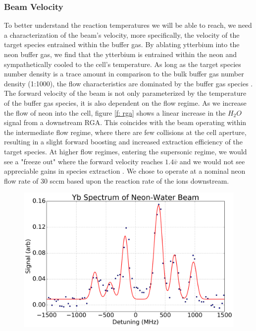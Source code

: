 \documentclass[a4paper]{article}
\begin{document}
\subsubsection{Beam Velocity}

To better understand the reaction temperatures we will be able to reach, we need a characterization of the beam's velocity, more specifically, the velocity of the target species entrained within the buffer gas. By ablating ytterbium into the neon buffer gas, we find that the ytterbium is entrained within the neon and sympathetically cooled to the cell's temperature. As long as the target species number density is a trace amount in comparison to the bulk buffer gas number density (1:1000), the flow characteristics are dominated by the buffer gas species \cite{Hutzler2012}. The forward velocity of the beam is not only parameterized by the temperature of the buffer gas species, it is also dependent on the flow regime. As we increase the flow of neon into the cell, figure \ref{f: rga} shows a linear increase in the $H_2O$ signal from a downstream RGA. This coincides with the beam operating within the intermediate flow regime, where there are few collisions at the cell aperture, resulting in a slight forward boosting and increased extraction efficiency of the target species. At higher flow regimes, entering the supersonic regime, we would see a "freeze out" where the forward velocity reaches $1.4\bar{v}$ and we would not see appreciable gains in species extraction \cite{Hutzler2012}. We chose to operate at a nominal neon flow rate of 30 sccm based upon the reaction rate of the ions downstream.

\begin{figure}[H]
\centering
\includegraphics[width=1\textwidth]{CBGB_yb_spectrum_long.png}
\caption{\label{f: yb_spectrum}}
\end{figure}
\end{document}
